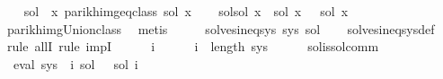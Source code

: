 \begin{isabellebody}
%
\isadelimproof
%
\endisadelimproof
%
\isatagproof
{}\isamarkupfalse%
\isanewline
\ \ \isamarkupfalse%
\ {\isacharquery}{\kern0pt}sol{\isacharprime}{\kern0pt}\ {\isacharequal}{\kern0pt}\ {\isachardoublequoteopen}{\isasymlambda}x{\isachardot}{\kern0pt}\ {\isasymUnion}{\isacharparenleft}{\kern0pt}parikh{\isacharunderscore}{\kern0pt}img{\isacharunderscore}{\kern0pt}eq{\isacharunderscore}{\kern0pt}class\ {\isacharparenleft}{\kern0pt}sol\ x{\isacharparenright}{\kern0pt}{\isacharparenright}{\kern0pt}{\isachardoublequoteclose}\isanewline
\ \ \isamarkupfalse%
\ sol{\isacharprime}{\kern0pt}{\isacharunderscore}{\kern0pt}sol{\isacharcolon}{\kern0pt}\ {\isachardoublequoteopen}{\isasymforall}x{\isachardot}{\kern0pt}\ {\isasymPsi}\ {\isacharparenleft}{\kern0pt}{\isacharquery}{\kern0pt}sol{\isacharprime}{\kern0pt}\ x{\isacharparenright}{\kern0pt}\ {\isacharequal}{\kern0pt}\ {\isasymPsi}\ {\isacharparenleft}{\kern0pt}sol\ x{\isacharparenright}{\kern0pt}{\isachardoublequoteclose}\isanewline
\ \ \ \ \ \ \isamarkupfalse%
\ parikh{\isacharunderscore}{\kern0pt}img{\isacharunderscore}{\kern0pt}Union{\isacharunderscore}{\kern0pt}class\ \isamarkupfalse%
\ metis\isanewline
\ \ \isamarkupfalse%
\ \isamarkupfalse%
\ {\isachardoublequoteopen}solves{\isacharunderscore}{\kern0pt}ineq{\isacharunderscore}{\kern0pt}sys\ sys\ {\isacharquery}{\kern0pt}sol{\isacharprime}{\kern0pt}{\isachardoublequoteclose}\isanewline
\ \ \isamarkupfalse%
\ solves{\isacharunderscore}{\kern0pt}ineq{\isacharunderscore}{\kern0pt}sys{\isacharunderscore}{\kern0pt}def\ \isamarkupfalse%
\ {\isacharparenleft}{\kern0pt}rule\ allI{\isacharcomma}{\kern0pt}\ rule\ impI{\isacharparenright}{\kern0pt}\isanewline
\ \ \ \ \isamarkupfalse%
\ i\isanewline
\ \ \ \ \isamarkupfalse%
\ {\isachardoublequoteopen}i\ {\isacharless}{\kern0pt}\ length\ sys{\isachardoublequoteclose}\isanewline
\ \ \ \ \isamarkupfalse%
\ sol{\isacharunderscore}{\kern0pt}is{\isacharunderscore}{\kern0pt}sol{\isacharunderscore}{\kern0pt}comm\ \isamarkupfalse%
\ {\isachardoublequoteopen}{\isasymPsi}\ {\isacharparenleft}{\kern0pt}eval\ {\isacharparenleft}{\kern0pt}sys\ {\isacharbang}{\kern0pt}\ i{\isacharparenright}{\kern0pt}\ sol{\isacharparenright}{\kern0pt}\ {\isasymsubseteq}\ {\isasymPsi}\ {\isacharparenleft}{\kern0pt}sol\ i{\isacharparenright}{\kern0pt}{\isachardoublequoteclose}\isanewline

\end{isabellebody}

